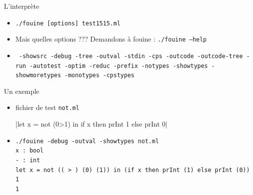 \documentclass{beamer}
\begin{document}
\begin{frame}{L'interprète}
  \begin{itemize}

  \item<1-> \texttt{./fouine [options] test1515.ml}

  \item<2->  Mais quelles options ??? Demandons à fouine : \texttt{./fouine --help}

  \item<3->  \texttt{
      -showsrc -debug -tree -outval -stdin -cps -outcode -outcode-tree -run -autotest -optim -reduc -prefix -notypes -showtypes -showmoretypes -monotypes -cpstypes
    }

  \end{itemize}
\end{frame}


\begin{frame}[fragile]{Un exemple}
  \begin{itemize}
  \item fichier de test \texttt{not.ml}

    |let x = not (0>1) in if x then prInt 1 else prInt 0|

  \item
    \begin{verbatim}
./fouine -debug -outval -showtypes not.ml
x : bool
- : int
let x = not (( > ) (0) (1)) in (if x then prInt (1) else prInt (0))
1
1
    \end{verbatim}


  \end{itemize}
\end{frame}
\end{document}
